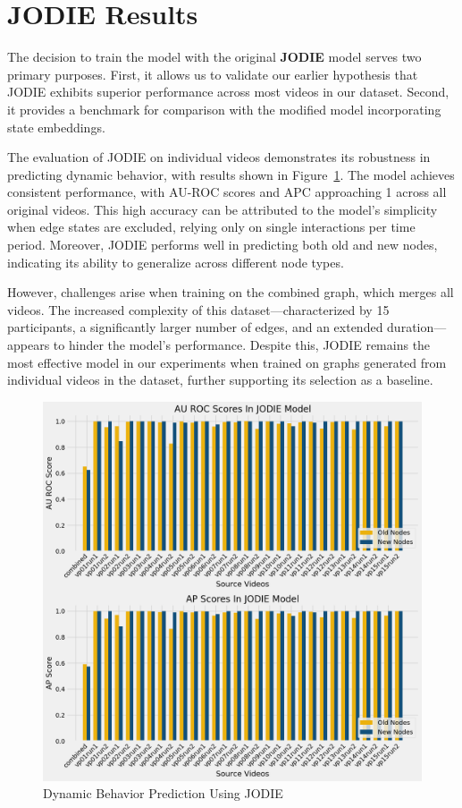 \section{JODIE Results}


The decision to train the model with the original \textbf{JODIE} model serves two primary purposes. First, it allows us to validate our earlier hypothesis that JODIE exhibits superior performance across most videos in our dataset. Second, it provides a benchmark for comparison with the modified model incorporating state embeddings.

The evaluation of JODIE on individual videos demonstrates its robustness in predicting dynamic behavior, with results shown in Figure~\ref{fig:JODIE_results}. The model achieves consistent performance, with AU-ROC scores and APC approaching 1 across all original videos. This high accuracy can be attributed to the model's simplicity when edge states are excluded, relying only on single interactions per time period. Moreover, JODIE performs well in predicting both old and new nodes, indicating its ability to generalize across different node types.

However, challenges arise when training on the combined graph, which merges all videos. The increased complexity of this dataset—characterized by 15 participants, a significantly larger number of edges, and an extended duration—appears to hinder the model's performance. Despite this, JODIE remains the most effective model in our experiments when trained on graphs generated from individual videos in the dataset, further supporting its selection as a baseline.



\begin{figure}
    \centering
    \includegraphics[width=\textwidth]{figures/05_JODIE.png}
    \caption{Dynamic Behavior Prediction Using JODIE}
    \label{fig:JODIE_results}
\end{figure}

